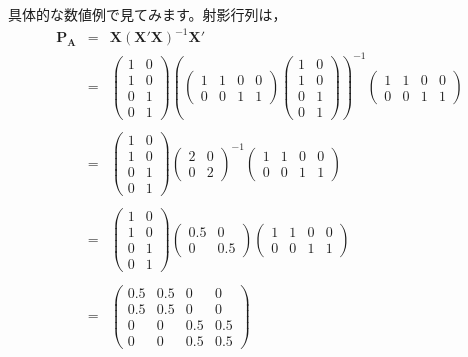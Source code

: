 \documentclass{ltjsbook}
\begin{document}
具体的な数値例で見てみます。射影行列は，
\[
	\begin{array}{lll}
		\bm{P_A} & = & \bm{X}(\bm{X}'\bm{X})^{-1}\bm{X}'                      \\
		         & = & \begin{pmatrix}1&0\\1&0\\ 0&1\\0&1\end{pmatrix} \left(
		\begin{pmatrix} 1 & 1 & 0 & 0 \\ 0 & 0 & 1 & 1 \end{pmatrix}
		\begin{pmatrix} 1 & 0 \\ 1 & 0 \\ 0 & 1 \\ 0 & 1 \end{pmatrix}
		\right)^{-1}
		\begin{pmatrix} 1 & 1 & 0 & 0 \\ 0 & 0 & 1 & 1 \end{pmatrix}          \\
		         &   &                                                        \\
		         & = &
		\begin{pmatrix}1&0\\1&0\\ 0&1\\0&1\end{pmatrix}
		\begin{pmatrix}2 & 0 \\ 0 & 2 \end{pmatrix}^{-1}
		\begin{pmatrix} 1 & 1 & 0 & 0 \\ 0 & 0 & 1 & 1 \end{pmatrix}          \\
		         &   &                                                        \\
		         & = &
		\begin{pmatrix}1&0\\1&0\\ 0&1\\0&1\end{pmatrix}
		\begin{pmatrix}0.5 & 0 \\ 0 & 0.5 \end{pmatrix}
		\begin{pmatrix} 1 & 1 & 0 & 0 \\ 0 & 0 & 1 & 1 \end{pmatrix}          \\
		         &   &                                                        \\
		         & = &
		\begin{pmatrix} 0.5 & 0.5 & 0 & 0 \\ 0.5 & 0.5 & 0 & 0 \\ 0 & 0 & 0.5 & 0.5 \\ 0 & 0 & 0.5 & 0.5 \end{pmatrix}
	\end{array}
\]
\end{document}

